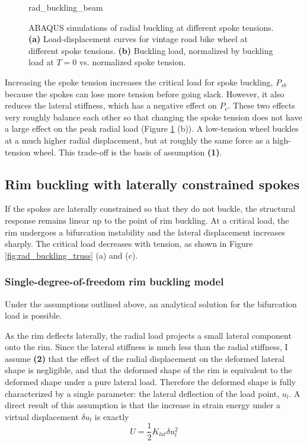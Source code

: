 \documentclass[\rootdir/thesis.tex]{subfiles}
\begin{document}
\begin{figure}
\centering
{rad_buckling_beam}
\caption{ABAQUS simulations of radial buckling at different spoke tensions. \textbf{(a)} Load-displacement curves for vintage road bike wheel at different spoke tensions. \textbf{(b)} Buckling load, normalized by buckling load at $T=0$ vs. normalized spoke tension.}
\label{fig:rad_buckling_beam}
\end{figure}

Increasing the spoke tension increases the critical load for spoke buckling, $P_{sb}$ because the spokes can lose more tension before going slack. However, it also reduces the lateral stiffness, which has a negative effect on $P_c$. These two effects very roughly balance each other so that changing the spoke tension does not have a large effect on the peak radial load (Figure \ref{fig:rad_buckling_beam} (b)). A low-tension wheel buckles at a much higher radial displacement, but at roughly the same force as a high-tension wheel. This trade-off is the basis of assumption \textbf{(1)}.

\subsection{Rim buckling with laterally constrained spokes}

If the spokes are laterally constrained so that they do not buckle, the structural response remains linear up to the point of rim buckling. At a critical load, the rim undergoes a bifurcation instability and the lateral displacement increases sharply. The critical load decreases with tension, as shown in Figure \ref{fig:rad_buckling_truss} (a) and (c).

\subsubsection{Single-degree-of-freedom rim buckling model}

Under the assumptions outlined above, an analytical solution for the bifurcation load is possible.

As the rim deflects laterally, the radial load projects a small lateral component onto the rim. Since the lateral stiffness is much less than the radial stiffness, I assume \textbf{(2)} that the effect of the radial displacement on the deformed lateral shape is negligible, and that the deformed shape of the rim is equivalent to the deformed shape under a pure lateral load. Therefore the deformed shape is fully characterized by a single parameter: the lateral deflection of the load point, $u_l$. A direct result of this assumption is that the increase in strain energy under a virtual displacement $\delta u_l$ is exactly
\begin{equation}
\label{eq:U_rim_1dof}
U = \frac{1}{2}K_{lat}\delta u_l^2
\end{equation}
\end{document}
